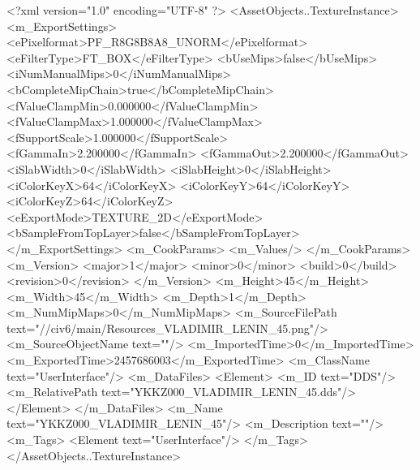 <?xml version="1.0" encoding="UTF-8" ?>
<AssetObjects..TextureInstance>
	<m_ExportSettings>
		<ePixelformat>PF_R8G8B8A8_UNORM</ePixelformat>
		<eFilterType>FT_BOX</eFilterType>
		<bUseMips>false</bUseMips>
		<iNumManualMips>0</iNumManualMips>
		<bCompleteMipChain>true</bCompleteMipChain>
		<fValueClampMin>0.000000</fValueClampMin>
		<fValueClampMax>1.000000</fValueClampMax>
		<fSupportScale>1.000000</fSupportScale>
		<fGammaIn>2.200000</fGammaIn>
		<fGammaOut>2.200000</fGammaOut>
		<iSlabWidth>0</iSlabWidth>
		<iSlabHeight>0</iSlabHeight>
		<iColorKeyX>64</iColorKeyX>
		<iColorKeyY>64</iColorKeyY>
		<iColorKeyZ>64</iColorKeyZ>
		<eExportMode>TEXTURE_2D</eExportMode>
		<bSampleFromTopLayer>false</bSampleFromTopLayer>
	</m_ExportSettings>
	<m_CookParams>
		<m_Values/>
	</m_CookParams>
	<m_Version>
		<major>1</major>
		<minor>0</minor>
		<build>0</build>
		<revision>0</revision>
	</m_Version>
	<m_Height>45</m_Height>
	<m_Width>45</m_Width>
	<m_Depth>1</m_Depth>
	<m_NumMipMaps>0</m_NumMipMaps>
	<m_SourceFilePath text="//civ6/main/Resources_VLADIMIR_LENIN_45.png"/>
	<m_SourceObjectName text=""/>
	<m_ImportedTime>0</m_ImportedTime>
	<m_ExportedTime>2457686003</m_ExportedTime>
	<m_ClassName text="UserInterface"/>
	<m_DataFiles>
		<Element>
			<m_ID text="DDS"/>
			<m_RelativePath text="YKKZ000_VLADIMIR_LENIN_45.dds"/>
		</Element>
	</m_DataFiles>
	<m_Name text="YKKZ000_VLADIMIR_LENIN_45"/>
	<m_Description text=""/>
	<m_Tags>
		<Element text="UserInterface"/>
	</m_Tags>
</AssetObjects..TextureInstance>

